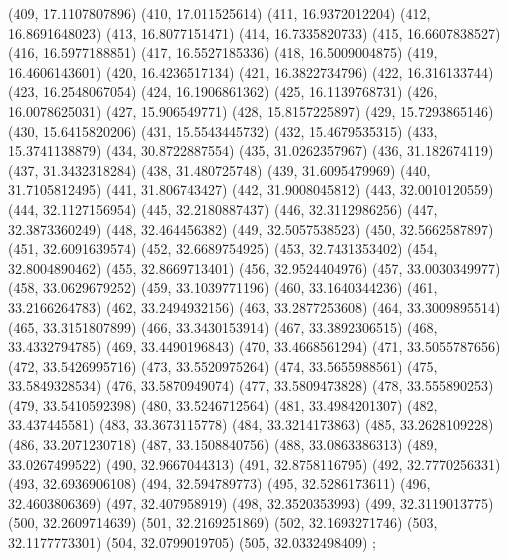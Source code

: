 {					(409, 17.1107807896)
					(410, 17.011525614)
					(411, 16.9372012204)
					(412, 16.8691648023)
					(413, 16.8077151471)
					(414, 16.7335820733)
					(415, 16.6607838527)
					(416, 16.5977188851)
					(417, 16.5527185336)
					(418, 16.5009004875)
					(419, 16.4606143601)
					(420, 16.4236517134)
					(421, 16.3822734796)
					(422, 16.316133744)
					(423, 16.2548067054)
					(424, 16.1906861362)
					(425, 16.1139768731)
					(426, 16.0078625031)
					(427, 15.906549771)
					(428, 15.8157225897)
					(429, 15.7293865146)
					(430, 15.6415820206)
					(431, 15.5543445732)
					(432, 15.4679535315)
					(433, 15.3741138879)
					(434, 30.8722887554)
					(435, 31.0262357967)
					(436, 31.182674119)
					(437, 31.3432318284)
					(438, 31.480725748)
					(439, 31.6095479969)
					(440, 31.7105812495)
					(441, 31.806743427)
					(442, 31.9008045812)
					(443, 32.0010120559)
					(444, 32.1127156954)
					(445, 32.2180887437)
					(446, 32.3112986256)
					(447, 32.3873360249)
					(448, 32.464456382)
					(449, 32.5057538523)
					(450, 32.5662587897)
					(451, 32.6091639574)
					(452, 32.6689754925)
					(453, 32.7431353402)
					(454, 32.8004890462)
					(455, 32.8669713401)
					(456, 32.9524404976)
					(457, 33.0030349977)
					(458, 33.0629679252)
					(459, 33.1039771196)
					(460, 33.1640344236)
					(461, 33.2166264783)
					(462, 33.2494932156)
					(463, 33.2877253608)
					(464, 33.3009895514)
					(465, 33.3151807899)
					(466, 33.3430153914)
					(467, 33.3892306515)
					(468, 33.4332794785)
					(469, 33.4490196843)
					(470, 33.4668561294)
					(471, 33.5055787656)
					(472, 33.5426995716)
					(473, 33.5520975264)
					(474, 33.5655988561)
					(475, 33.5849328534)
					(476, 33.5870949074)
					(477, 33.5809473828)
					(478, 33.555890253)
					(479, 33.5410592398)
					(480, 33.5246712564)
					(481, 33.4984201307)
					(482, 33.437445581)
					(483, 33.3673115778)
					(484, 33.3214173863)
					(485, 33.2628109228)
					(486, 33.2071230718)
					(487, 33.1508840756)
					(488, 33.0863386313)
					(489, 33.0267499522)
					(490, 32.9667044313)
					(491, 32.8758116795)
					(492, 32.7770256331)
					(493, 32.6936906108)
					(494, 32.594789773)
					(495, 32.5286173611)
					(496, 32.4603806369)
					(497, 32.407958919)
					(498, 32.3520353993)
					(499, 32.3119013775)
					(500, 32.2609714639)
					(501, 32.2169251869)
					(502, 32.1693271746)
					(503, 32.1177773301)
					(504, 32.0799019705)
					(505, 32.0332498409)
				};
